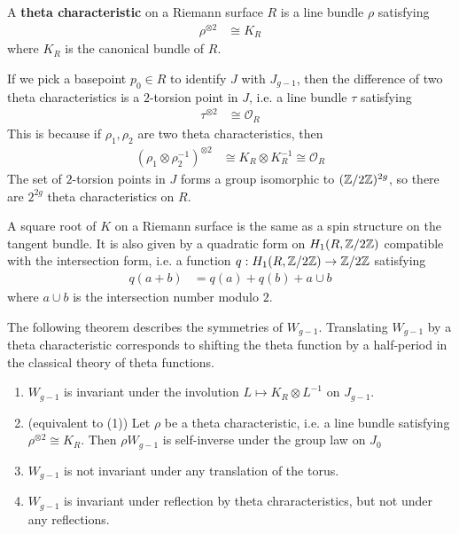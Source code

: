\documentclass[12pt]{article}
\begin{document}
\begin{definition}
    A \textbf{theta characteristic} on a Riemann surface $R$ is a line bundle $\rho$ satisfying \begin{align*}
        \rho^{\otimes 2} & \cong K_R
    \end{align*} where $K_R$ is the canonical bundle of $R$.
\end{definition}
If we pick a basepoint $p_0 \in R$ to identify $J$ with $J_{g-1}$, then the difference of two theta characteristics is a $2$-torsion point in $J$, i.e. a line bundle $\tau$ satisfying \begin{align*}
    \tau^{\otimes 2} & \cong \mathcal{O}_R
\end{align*} This is because if $\rho_1, \rho_2$ are two theta characteristics, then \begin{align*}
    (\rho_1 \otimes \rho_2^{-1})^{\otimes 2} & \cong K_R \otimes K_R^{-1} \cong \mathcal{O}_R
\end{align*} The set of $2$-torsion points in $J$ forms a group isomorphic to $(\mathbb{Z}/2\mathbb{Z})^{2g}$, so there are $2^{2g}$ theta characteristics on $R$.

\begin{remark}
     A square root of $K$ on a Riemann surface is the same as a spin structure on the tangent bundle. It is also given by a quadratic form on $H_1(R, \mathbb{Z}/2\mathbb{Z})$ compatible with the intersection form, i.e. a function $q:H_1(R, \mathbb{Z}/2\mathbb{Z}) \to \mathbb{Z}/2\mathbb{Z}$ satisfying \begin{align*}
        q(a + b) & = q(a) + q(b) + a \cup b
    \end{align*} where $a \cup b$ is the intersection number modulo $2$. 
\end{remark}

The following theorem describes the symmetries of $W_{g-1}$. Translating $W_{g-1}$ by a theta characteristic corresponds to shifting the theta function by a half-period in the classical theory of theta functions.

\begin{theorem}
    \leavevmode
    \begin{enumerate}
        \item $W_{g-1}$ is invariant under the involution $L \mapsto K_R\otimes L^{-1}$ on $J_{g-1}$.
        \item (equivalent to (1)) Let $\rho$ be a theta characteristic, i.e. a line bundle satisfying $\rho^{\otimes 2} \cong K_R$. Then $\rho W_{g-1}$ is self-inverse under the group law on $J_0$
        \item $W_{g-1}$ is not invariant under any translation of the torus.
        \item $W_{g-1}$ is invariant under reflection by theta chraracteristics, but not under any reflections.
    \end{enumerate}
\end{theorem}
\end{document}
